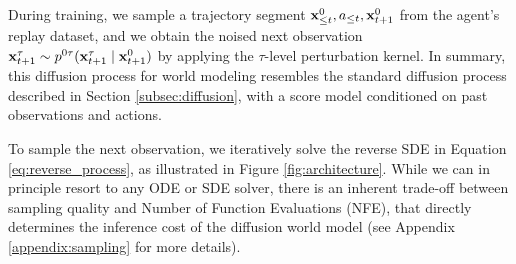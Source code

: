 During training, we sample a trajectory segment $\mathbf{x}_{\le t}^0, a_{\le t}, \mathbf{x}_{t+1}^0$ from the agent's replay dataset, and we obtain the noised next observation $\mathbf{x}_{t+1}^\tau \sim p^{0\tau}(\mathbf{x}_{t+1}^\tau \mid \mathbf{x}_{t+1}^0)$ by applying the $\tau$-level perturbation kernel. In summary, this diffusion process for world modeling resembles the standard diffusion process described in Section \ref{subsec:diffusion}, with a score model conditioned on past observations and actions.

To sample the next observation, we iteratively solve the reverse SDE in Equation \ref{eq:reverse_process}, as illustrated in Figure \ref{fig:architecture}. While we can in principle resort to any ODE or SDE solver, there is an inherent trade-off between sampling quality and Number of Function Evaluations (NFE), that directly determines the inference cost of the diffusion world model (see Appendix \ref{appendix:sampling} for more details).
